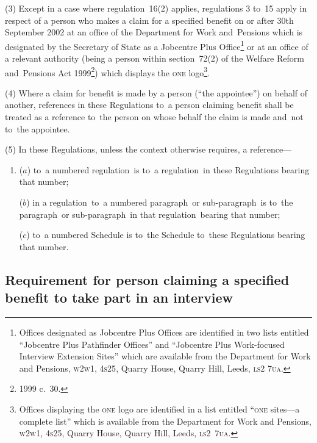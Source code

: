 \documentclass[12pt,a4paper]{article}
\begin{document}
(3) Except in a case where regulation~16(2) applies, regulations 3 to~15 apply in respect of a person who makes a claim for a specified benefit on or after 30th September 2002 at an office of the Department for Work and~Pensions which is designated by the Secretary of State as a Jobcentre Plus Office\footnote{Offices designated as Jobcentre Plus Offices are identified in two lists entitled “Jobcentre Plus Pathfinder Offices” and “Jobcentre Plus Work-focused Interview Extension Sites” which are available from the Department for Work and Pensions, \textsc{\lowercase{W2W1, 4S25}}, Quarry House, Quarry Hill, Leeds, \textsc{\lowercase{LS2 7UA}}.} or at an office of a relevant authority (being a person within section~72(2) of the Welfare Reform and~Pensions Act 1999\footnote{1999 c.~30.}) which displays the \textsc{\lowercase{ONE}} logo\footnote{Offices displaying the \textsc{\lowercase{ONE}} logo are identified in a list entitled “\textsc{\lowercase{ONE}} sites—a complete list” which is available from the Department for Work and Pensions, \textsc{\lowercase{W2W1, 4S25}}, Quarry House, Quarry Hill, Leeds, \textsc{\lowercase{LS2~7UA}}.}.

\enlargethispage{-\baselineskip}

(4) Where a claim for benefit is made by a person (“the appointee”) on behalf of another, references in these Regulations to~a person claiming benefit shall be treated as a reference to~the person on whose behalf the claim is made and~not to~the appointee.

(5) In these Regulations, unless the context otherwise requires, a reference—
\begin{enumerate}\item[]
($a$) to~a numbered regulation~is to~a regulation~in these Regulations bearing that number;

($b$) in a regulation~to~a numbered paragraph~or sub-paragraph~is to~the paragraph~or sub-paragraph~in that regulation~bearing that number;

($c$) to~a numbered Schedule is to~the Schedule to~these Regulations bearing that number.
\end{enumerate}

\subsection[3. Requirement for person claiming a specified benefit to~take part in an interview]{Requirement for person claiming a specified benefit to take part in an interview}
\end{document}
